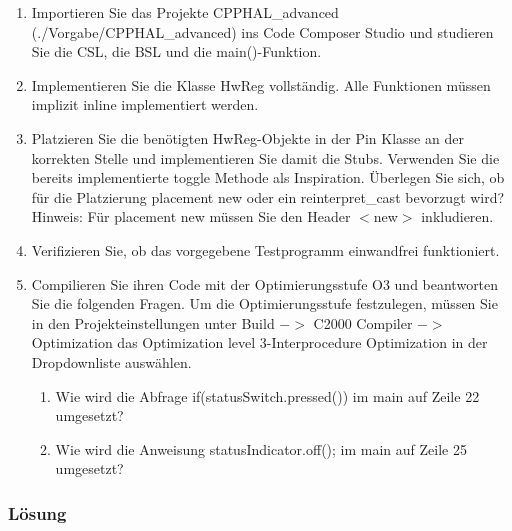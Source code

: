 \begin{enumerate}
  \item  Importieren Sie das Projekte CPPHAL\_advanced (./Vorgabe/CPPHAL\_advanced) ins Code Composer
Studio und studieren Sie die CSL, die BSL und die main()-Funktion.
\item Implementieren Sie die Klasse HwReg vollständig. Alle Funktionen müssen implizit inline implementiert
werden.
\item  Platzieren Sie die benötigten HwReg-Objekte in der Pin Klasse an der korrekten Stelle und implementieren
Sie damit die Stubs. Verwenden Sie die bereits implementierte toggle Methode als Inspiration.
Überlegen Sie sich, ob für die Platzierung placement new oder ein reinterpret\_cast bevorzugt wird?
Hinweis: Für placement new müssen Sie den Header $<$new$>$ inkludieren.
\item Verifizieren Sie, ob das vorgegebene Testprogramm einwandfrei funktioniert.
\item  Compilieren Sie ihren Code mit der Optimierungsstufe O3 und beantworten Sie die folgenden Fragen.
Um die Optimierungsstufe festzulegen, müssen Sie in den Projekteinstellungen unter Build $->$ C2000
Compiler $->$ Optimization das Optimization level 3-Interprocedure Optimization in der Dropdownliste
auswählen.
\begin{enumerate}
  \item  Wie wird die Abfrage if(statusSwitch.pressed()) im main auf Zeile 22 umgesetzt?
  \item  Wie wird die Anweisung statusIndicator.off(); im main auf Zeile 25 umgesetzt?

\end{enumerate}
\end{enumerate}

\subsubsection{Lösung}

